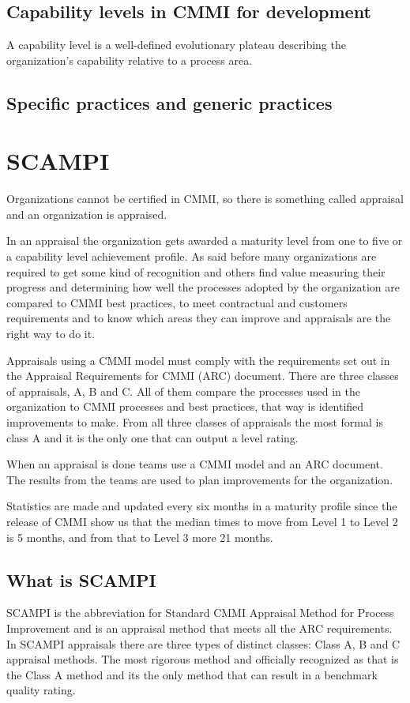 \subsection{Capability levels in CMMI for development}
A capability level is a well-defined evolutionary plateau describing the organization’s capability relative to a process area.

\subsection{Specific practices and generic practices}

\section{SCAMPI}
Organizations cannot be certified in CMMI, so there is something called appraisal and an organization is appraised.

In an appraisal the organization gets awarded a maturity level from one to five or a capability level achievement profile. As said before many organizations are required to get some kind of recognition and others find value measuring their progress and determining how well the processes adopted by the organization are compared to CMMI best practices, to meet contractual and customers requirements and to know which areas they can improve and appraisals are the right way to do it.

Appraisals using a CMMI model must comply with the requirements set out in the Appraisal Requirements for CMMI (ARC) document. There are three classes of appraisals, A, B and C. All of them compare the processes used in the organization to CMMI processes and best practices, that way is identified improvements to make. From all three classes of appraisals the most formal is class A and it is the only one that can output a level rating.

When an appraisal is done teams use a CMMI model and an ARC document. The results from the teams are used to plan improvements for the organization.

Statistics are made and updated every six months in a maturity profile since the release of CMMI show us that the median times to move from Level 1 to Level 2 is 5 months, and from that to Level 3 more 21 months.

\subsection{What is SCAMPI}
SCAMPI is the abbreviation for Standard CMMI Appraisal Method for Process Improvement and is an appraisal method that meets all the ARC requirements.
In SCAMPI appraisals there are three types of distinct classes: Class A, B and C appraisal methods. The most rigorous method and officially recognized as that is the Class A method and its the only method that can result in a benchmark quality rating. 

